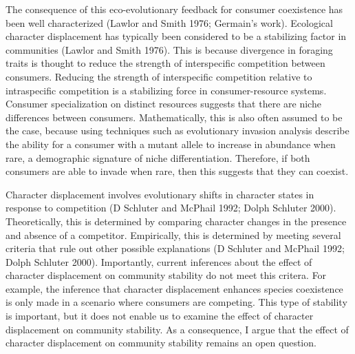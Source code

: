 \documentclass[11pt,]{article}
\begin{document}
The consequence of this eco-evolutionary feedback for consumer
coexistence has been well characterized (Lawlor and Smith 1976;
Germain's work). Ecological character displacement has typically been
considered to be a stabilizing factor in communities (Lawlor and Smith
1976). This is because divergence in foraging traits is thought to
reduce the strength of interspecific competition between consumers.
Reducing the strength of interspecific competition relative to
intraspecific competition is a stabilizing force in consumer-resource
systems. Consumer specialization on distinct resources suggests that
there are niche differences between consumers. Mathematically, this is
also often assumed to be the case, because using techniques such as
evolutionary invasion analysis describe the ability for a consumer with
a mutant allele to increase in abundance when rare, a demographic
signature of niche differentiation. Therefore, if both consumers are
able to invade when rare, then this suggests that they can coexist.

Character displacement involves evolutionary shifts in character states
in response to competition (D Schluter and McPhail 1992; Dolph Schluter
2000). Theoretically, this is determined by comparing character changes
in the presence and absence of a competitor. Empirically, this is
determined by meeting several criteria that rule out other possible
explanations (D Schluter and McPhail 1992; Dolph Schluter 2000).
Importantly, current inferences about the effect of character
displacement on community stability do not meet this critera. For
example, the inference that character displacement enhances species
coexistence is only made in a scenario where consumers are competing.
This type of stability is important, but it does not enable us to
examine the effect of character displacement on community stability. As
a consequence, I argue that the effect of character displacement on
community stability remains an open question.
\end{document}
